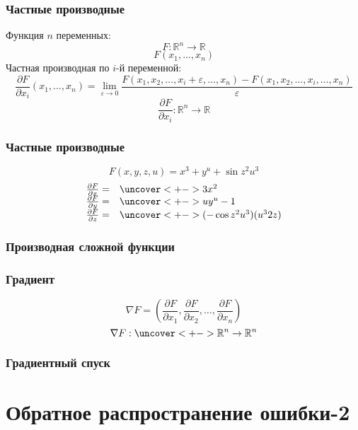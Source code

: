 \documentclass[24pt,pdf,hyperref={unicode}]{beamer}
\newcommand{\dd}[2]{\frac{\partial #1}{\partial #2}}
\begin{document}
% 
% 
% 
% 
% 
% 

\begin{frame}\frametitle{Частные производные}
Функция $n$ переменных:
$$
F:\mathbb{R}^n\rightarrow\mathbb{R} 
$$
$$
F(x_1,\ldots,x_n)
$$
Частная производная по $i$-й переменной:
$$
\dd{F}{x_i}(x_1,\ldots,x_n)=\lim_{\varepsilon\rightarrow 0}\frac{F(x_1,x_2,\ldots,x_i+\varepsilon,\ldots,x_n)-F(x_1,x_2,\ldots,x_i,\ldots,x_n)}{\varepsilon}
$$
$$
\dd{F}{x_i}:\mathbb{R}^n\rightarrow\mathbb{R}
$$

\end{frame}
\uncover<+->{}
\begin{frame}\frametitle{Частные производные}
$$
F(x,y,z,u)=x^3+y^u+\sin z^2u^3
$$
$$
\begin{array}{l l}
\dd{F}{x} = & \uncover<+->{3x^2} \\
\dd{F}{y}= & \uncover<+->{uy^u-1} \\
\dd{F}{z}= & \uncover<+->{(-\cos z^2u^3)(u^32z)}
\end{array}
$$
\end{frame}

\begin{frame}\frametitle{Производная сложной функции}

\end{frame}

\begin{frame}\frametitle{Градиент}
\uncover<+->{}
$$
\nabla F = \left(\dd{F}{x_1},\dd{F}{x_2},\ldots,\dd{F}{x_n}\right)
$$
$$
\nabla F : \uncover<+->{\mathbb{R}^n\rightarrow\mathbb{R}^n}
$$
\end{frame}

\begin{frame}\frametitle{Градиентный спуск}

\end{frame}


\section{Обратное распространение ошибки-2}
\end{document}
